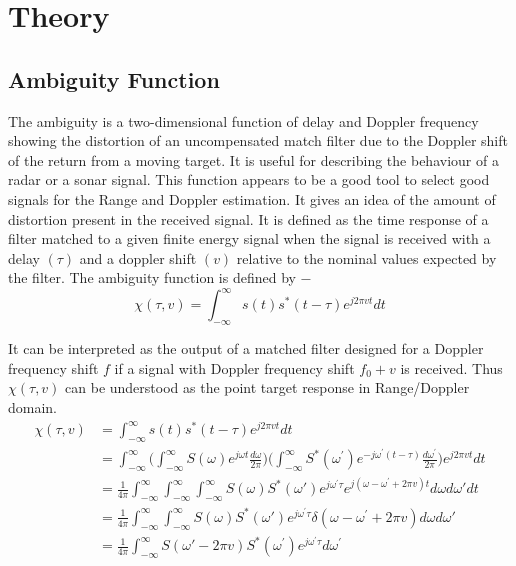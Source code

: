 \chapter*{Theory}

\section*{ Ambiguity Function } 

\noindent The ambiguity is a two-dimensional function of delay and Doppler frequency showing the distortion of an uncompensated match filter due to the Doppler shift of the return from a moving target. It is useful for describing the behaviour of a radar or a sonar signal. This function appears to be a good tool to select good signals for the Range and Doppler estimation. It gives an idea of the amount of distortion present in the received signal. It is defined as the time response of a filter matched to a given finite energy signal when the signal is received with a delay $(\tau)$ and a doppler shift $(v)$ relative to the nominal values expected by the filter. The ambiguity function is defined by $-$
\begin{equation}
 \chi(\tau,v) = \int_{-\infty}^{\infty} s(t) s^{*}(t-\tau) e^{j2\pi vt}dt
 \end{equation}
 
 \noindent It can be interpreted as the output of a matched filter designed for a Doppler frequency shift $f$ if a signal with Doppler frequency shift $f_{0} +v$ is received. Thus $\chi(\tau,v)$ can be understood as the point target response in Range/Doppler domain.
\begin{equation} \label{eq2}
\begin{split}
\chi(\tau,v) & = \int_{-\infty}^{\infty} s(t) s^{*}(t-\tau) e^{j2\pi vt}dt \\
 & = \int_{-\infty}^{\infty} \Bigg( \int_{-\infty}^{\infty} S(\omega)e^{j\omega t}\frac{d\omega}{2\pi}\Bigg) \Bigg( \int_{-\infty}^{\infty} S^{*}(\omega^{'})e^{-j\omega^{'}(t-\tau)}\frac{d\omega^{'}}{2\pi}\Bigg) e^{j2\pi vt}dt \\
 & = \frac{1}{4\pi}\int_{-\infty}^{\infty}\int_{-\infty}^{\infty}\int_{-\infty}^{\infty} S(\omega)S^{*}(\omega{'})e^{j\omega^{'}\tau}e^{j(\omega - \omega^{'} + 2\pi v)t} d\omega d\omega{'} dt \\
 & = \frac{1}{4\pi}\int_{-\infty}^{\infty}\int_{-\infty}^{\infty}S(\omega)S^{*}(\omega{'})e^{j\omega^{'}\tau} \delta(\omega - \omega^{'} + 2\pi v) d\omega  d\omega{'} \\
 & = \frac{1}{4\pi}\int_{-\infty}^{\infty}S(\omega{'} - 2\pi v) S^{*}(\omega^{'})e^{j\omega^{'}\tau} d\omega^{'} \\
\end{split}
\end{equation}


